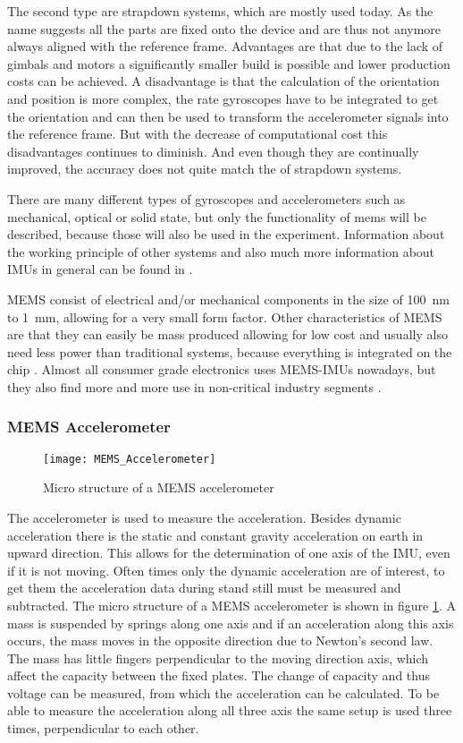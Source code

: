 The second type are strapdown systems, which are mostly used today.  
As the name suggests all the parts are fixed onto the device and are thus not anymore always aligned with the reference frame.
Advantages are that due to the lack of gimbals and motors a significantly smaller build is possible and lower production costs can be achieved.
A disadvantage is that the calculation of the orientation and position is more complex, the rate gyroscopes have to be integrated to get the orientation and can then be used to transform the accelerometer signals into the reference frame.
But with the decrease of computational cost this disadvantages continues to diminish. And even though they are continually improved, the accuracy does not quite match the of strapdown systems.

There are many different types of gyroscopes and accelerometers such as mechanical, optical or solid state, but only the functionality of \gls{mems} will be described, because those will also be used in the experiment. Information about the working principle of other systems and also much more information about IMUs in general can be found in \cite{Woodman07anintroduction}.

MEMS consist of electrical and/or mechanical components in the size of \SI{100}{\nano\metre} to \SI{1}{\milli\metre}, allowing for a very small form factor.
Other characteristics of MEMS are that they can easily be mass produced allowing for low cost and usually also need less power than traditional systems, because everything is integrated on the chip \cite{Shaeffer2013}.
Almost all consumer grade electronics uses MEMS-IMUs nowadays, but they also find more and more use in non-critical industry segments \cite{Perlmutter2016}.

\subsubsection{MEMS Accelerometer}
\begin{figure}[htb]
	\centering
	\texttt{[image: MEMS\_Accelerometer]}
	\caption{Micro structure of a MEMS accelerometer }
	\label{fig:MEMS_Accelerometer}
\end{figure}
The accelerometer is used to measure the acceleration.
Besides dynamic acceleration there is the static and constant gravity acceleration on earth in upward direction. 
This allows for the determination of one axis of the IMU, even if it is not moving.
Often times only the dynamic acceleration are of interest, to get them the acceleration data during stand still must be measured and subtracted.
The micro structure of a MEMS accelerometer is shown in figure \ref{fig:MEMS_Accelerometer}.
A mass is suspended by springs along one axis and if an acceleration along this axis occurs, the mass moves in the opposite direction due to Newton's second law.
The mass has little fingers perpendicular to the moving direction axis, which affect the capacity between the fixed plates.
The change of capacity and thus voltage can be measured, from which the acceleration can be calculated.
To be able to measure the acceleration along all three axis the same setup is used three times, perpendicular to each other.

